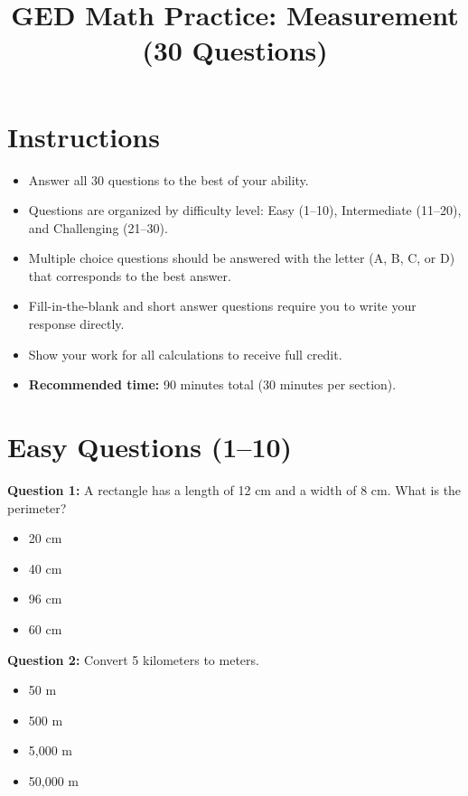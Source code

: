 \documentclass[12pt, letterpaper]{article}
\title{\textbf{GED Math Practice: Measurement (30 Questions)}}
\author{}
\date{}
\begin{document}
\maketitle

\section*{Instructions}

\begin{itemize}
    \item Answer all 30 questions to the best of your ability.
    \item Questions are organized by difficulty level: Easy (1--10), Intermediate (11--20), and Challenging (21--30).
    \item Multiple choice questions should be answered with the letter (A, B, C, or D) that corresponds to the best answer.
    \item Fill-in-the-blank and short answer questions require you to write your response directly.
    \item Show your work for all calculations to receive full credit.
    \item \textbf{Recommended time:} 90 minutes total (30 minutes per section).
\end{itemize}

\vspace{0.5cm}

\section*{Easy Questions (1--10)}

\noindent
\textbf{Question 1:} A rectangle has a length of 12 cm and a width of 8 cm. What is the perimeter?
\begin{itemize}
    \item[(A)] 20 cm
    \item[(B)] 40 cm
    \item[(C)] 96 cm
    \item[(D)] 60 cm
\end{itemize}

\noindent
\textbf{Question 2:} Convert 5 kilometers to meters.
\begin{itemize}
    \item[(A)] 50 m
    \item[(B)] 500 m
    \item[(C)] 5,000 m
    \item[(D)] 50,000 m
\end{itemize}
\end{document}

